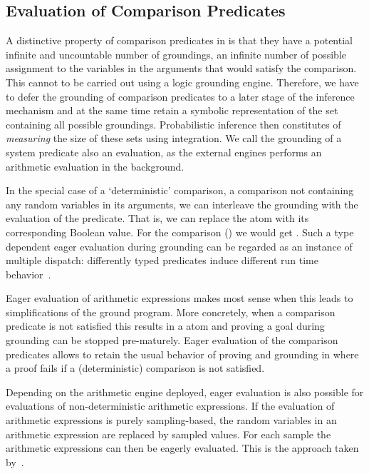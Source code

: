 \subsection*{Evaluation of Comparison Predicates}

A distinctive property of comparison predicates in \dcproblogsty is that they have a potential infinite and uncountable number of groundings, \ie an infinite number of possible assignment to the variables in the arguments that would satisfy the comparison.
This cannot to be carried out using a logic grounding engine.
Therefore, we have to defer the grounding of comparison predicates to a later stage of the inference mechanism and at the same time retain a symbolic representation of the set containing all possible groundings. Probabilistic inference then constitutes of {\em measuring} the size of these sets using integration.
We call the grounding of a system predicate also an evaluation, as the external engines performs an arithmetic evaluation in the background.

In the special case of a `deterministic' comparison, \ie a comparison not containing any random variables in its arguments, we can interleave the grounding with the evaluation of the predicate.
That is, we can replace the atom with its corresponding Boolean value. For the comparison () we would get . Such a type dependent eager evaluation during grounding can be regarded as an instance of multiple dispatch: differently typed predicates induce different run time behavior~\citep{castagna1995calculus}.

Eager evaluation of arithmetic expressions makes most sense when this leads to simplifications of the ground program. More concretely, when a comparison predicate is not satisfied this results in a  atom and proving a goal during grounding can be stopped pre-maturely.
Eager evaluation of the comparison predicates allows \dcproblogsty to retain the usual behavior of proving and grounding in \problogsty where a proof fails if a (deterministic) comparison is not satisfied.

Depending on the arithmetic engine deployed, eager evaluation is also possible for evaluations of non-deterministic arithmetic expressions. If the evaluation of arithmetic expressions is purely sampling-based, the random variables in an arithmetic expression are replaced by sampled values. For each sample the arithmetic expressions can then be eagerly evaluated. This is the approach taken by~\citet{nitti2016probabilistic}.

